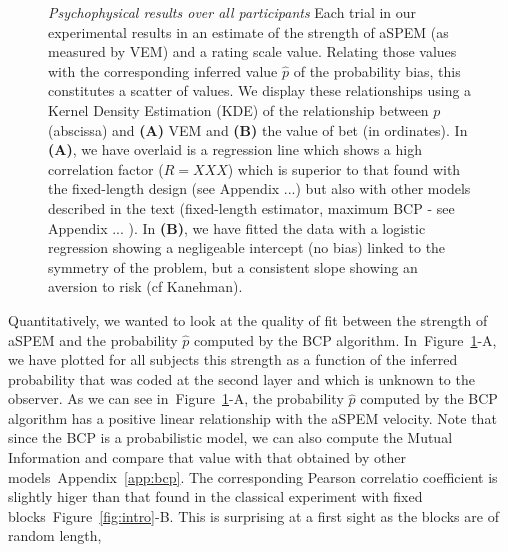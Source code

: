 \documentclass[profile,final,english, draft]{article}%
\newcommand{\seeFig}[1]{Figure~\ref{fig:#1}}
\newcommand{\seeApp}[1]{Appendix~\ref{app:#1}}
\begin{document}
\begin{figure}%
\begin{center}
\end{center}
\caption{\emph{Psychophysical results over all participants}
Each trial in our experimental results in an estimate of
the strength of aSPEM (as measured by VEM)
and a rating scale value.
Relating those values with the corresponding inferred value $\hat{p}$
of the probability bias,
this constitutes a scatter of values.
We display these relationships using a
Kernel Density Estimation (KDE) of the relationship between $p$ (abscissa)
and \textbf{(A)} VEM and \textbf{(B)} the value of bet (in ordinates).
In \textbf{(A)}, we have overlaid is a regression line which shows
a high correlation factor ($R=XXX$) which is superior to that found
with the fixed-length design (see Appendix ...)
but also with other models described in the text
(fixed-length estimator, maximum BCP - see Appendix ... ).
In \textbf{(B)}, we have fitted the data with a logistic regression
showing a negligeable intercept (no bias) linked to the symmetry
of the problem, but a consistent slope showing an aversion to risk
(cf Kanehman).
}
\label{fig:results_psycho}
\end{figure}
Quantitatively, we wanted to look at the quality of fit
between the strength of aSPEM and
the probability $\hat{p}$ computed by the BCP algorithm.
In~\seeFig{results_psycho}-A, we have plotted for all subjects
this strength as a function of the inferred probability
that was coded at the second layer and which is unknown to the observer.
As we can see in~\seeFig{results_psycho}-A,
the probability $\hat{p}$ computed by the BCP algorithm
has a positive linear relationship with the aSPEM velocity.
Note that since the BCP is a probabilistic model,
we can also compute the Mutual Information and
compare that value with that obtained by other models~\seeApp{bcp}.
The corresponding Pearson correlatio coefficient
is slightly higer than that found in
the classical experiment with fixed blocks~\seeFig{intro}-B.
This is surprising at a first sight as the blocks are of random length,
\end{document}
